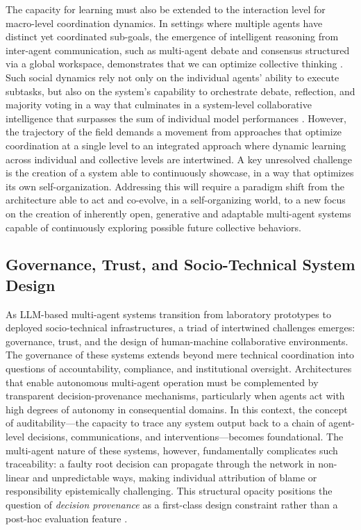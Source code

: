 \documentclass[11pt,a4paper]{article}
\begin{document}
The capacity for learning must also be extended to the interaction level for macro-level coordination dynamics. In settings where multiple agents have distinct yet coordinated sub-goals, the emergence of intelligent reasoning from inter-agent communication, such as multi-agent debate and consensus structured via a global workspace, demonstrates that we can optimize collective thinking \cite{arxiv:2407.10718v2}. Such social dynamics rely not only on the individual agents' ability to execute subtasks, but also on the system's capability to orchestrate debate, reflection, and majority voting in a way that culminates in a system-level collaborative intelligence that surpasses the sum of individual model performances \cite{arxiv:2311.08562v2}. However, the trajectory of the field demands a movement from approaches that optimize coordination at a single level to an integrated approach where dynamic learning across individual and collective levels are intertwined. A key unresolved challenge is the creation of a system able to continuously showcase, in a way that optimizes its own self-organization. Addressing this will require a paradigm shift from the architecture able to act and co-evolve, in a self-organizing world, to a new focus on the creation of inherently open, generative and adaptable multi-agent systems capable of continuously exploring possible future collective behaviors.


\subsection{Governance, Trust, and Socio-Technical System Design}


As LLM-based multi-agent systems transition from laboratory prototypes to deployed socio-technical infrastructures, a triad of intertwined challenges emerges: governance, trust, and the design of human-machine collaborative environments. The governance of these systems extends beyond mere technical coordination into questions of accountability, compliance, and institutional oversight. Architectures that enable autonomous multi-agent operation must be complemented by transparent decision-provenance mechanisms, particularly when agents act with high degrees of autonomy in consequential domains. In this context, the concept of auditability---the capacity to trace any system output back to a chain of agent-level decisions, communications, and interventions---becomes foundational. The multi-agent nature of these systems, however, fundamentally complicates such traceability: a faulty root decision can propagate through the network in non-linear and unpredictable ways, making individual attribution of blame or responsibility epistemically challenging. This structural opacity positions the question of \emph{decision provenance} as a first-class design constraint rather than a post-hoc evaluation feature \cite{arxiv:2404.04834v1,arxiv:2310.03659v1}.
\end{document}

